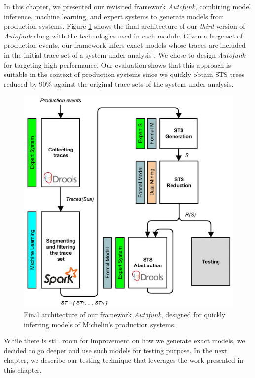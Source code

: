 In this chapter, we presented our revisited framework
\textit{Autofunk}, combining model inference, machine learning,
and expert systems to generate models from production systems.
Figure \ref{fig:autofunk_branded} shows the final architecture of
our \emph{third} version of \textit{Autofunk} along with the
technologies used in each module. Given a large set of production
events, our framework infers exact models whose traces are
included in the initial trace set of a system under analysis
\cite{petrenko06}.  We chose to design \textit{Autofunk} for
targeting high performance. Our evaluation shows that this
approach is suitable in the context of production systems since
we quickly obtain STS trees reduced by 90\% against the original
trace sets of the system under analysis.

\begin{figure}[h]
    \begin{center}
        \includegraphics[width=1.0\linewidth]{figures/autofunk_branded.png}
    \end{center}

    \caption{Final architecture of our framework \textit{Autofunk},
    designed for quickly inferring models of Michelin's production systems.}
    \label{fig:autofunk_branded}
\end{figure}

While there is still room for improvement on how we generate
exact models, we decided to go deeper and use such models for
testing purpose. In the next chapter, we describe our testing
technique that leverages the work presented in this chapter.
